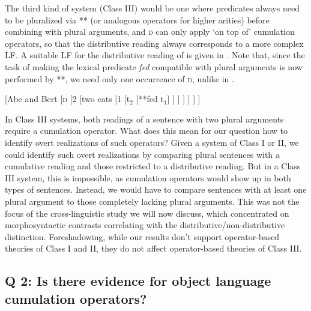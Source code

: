 \documentclass[output=paper]{langscibook}
\begin{document}
The third kind of system (Class III) would be one where predicates always need to be pluralized via ** (or analogous operators for higher arities) before combining with plural arguments, and \textsc{d} can only apply `on top of' cumulation operators, so that the distributive reading always corresponds to a more complex LF. A suitable LF for the distributive reading of  is given in . Note that, since the task of making the lexical predicate \textit{fed} compatible with plural arguments is now performed by **, we need only one occurrence of \textsc{d}, unlike in .

\ea \label{has-sch:15} {[Abe and Bert [\textsc{d} [2 [two cats [1 [t$_2$ [**fed t$_1$] ] ] ] ] ] ]} \z

\noindent In Class III systems, both readings of a sentence with two plural arguments require a cumulation operator. What does this mean for our question how to identify overt realizations of such operators? Given a system of Class I or II, we could identify such overt realizations by comparing plural sentences with a cumulative reading and those restricted to a distributive reading. But in a Class III system, this is impossible, as cumulation operators would show up in both types of sentences. Instead, we would have to compare sentences with at least one plural argument to those completely lacking plural arguments. This was not the focus of the cross-linguistic study we will now discuss,
which concentrated on morphosyntactic contrasts correlating with the distributive/non-distributive distinction. Foreshadowing, while our results don't support operator-based theories of Class I and II,  they do not affect operator-based theories of Class III.


\subsection{Q 2: Is there evidence for object language cumulation operators?}\label{has-sch:sec:3.3}
\end{document}
